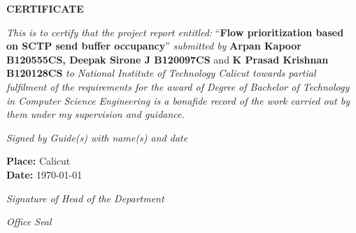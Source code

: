 \thispagestyle{empty}
\vspace*{1cm}
{\centering \textbf{CERTIFICATE}\\[1.5cm]}

\noindent
\textit{This is to certify that the project report entitled:}
``{\textbf{Flow prioritization based on SCTP send buffer occupancy}}''
\textit{submitted by}
\textbf{Arpan Kapoor B120555CS, Deepak Sirone J B120097CS} and
\textbf{K Prasad Krishnan B120128CS}
\textit{
to National Institute of Technology Calicut towards partial fulfilment of the
requirements for the award of Degree of Bachelor of Technology in Computer
Science Engineering is a bonafide record of the work carried out by them under
my supervision and guidance.}
\vspace{2cm}

\begin{flushright}
  \textit{Signed by Guide(s) with name(s) and date}
\end{flushright}

\vspace{1cm}

\parbox[t]{8.5cm}{
\textbf{Place:} Calicut \\
\textbf{Date:} \today \\
}

\begin{flushright}
  \vspace*{2cm}
  \textit{Signature of Head of the Department}
\end{flushright}

\begin{center}
  \vspace*{1cm}
  \textit{Office Seal}
\end{center}

